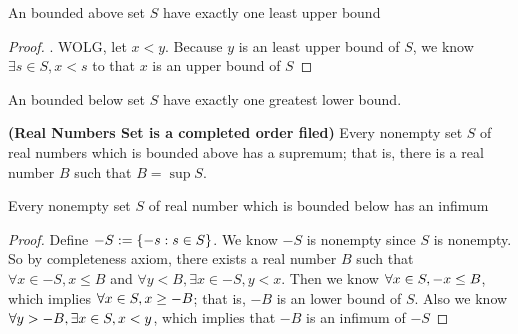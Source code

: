 \documentclass{report}
\begin{document}
\begin{theorem}
An bounded above set $S$ have exactly one least upper bound
\end{theorem}
\begin{proof}
. WOLG, let $x<y$. Because $y$ is an least upper bound of $S$, we know $\exists s\in S, x< s$ \CaC to that $x$ is an upper bound of $S$
\end{proof}
\begin{corollary}
An bounded below set $S$ have exactly one greatest lower bound.
\end{corollary}
\begin{axiom}
\textbf{(Real Numbers Set is a completed order filed)} Every nonempty set $S$ of real numbers which is bounded above has a supremum; that is, there is a real number $B$ such that $B=\sup S$.
\end{axiom}
\begin{theorem}
Every nonempty set $S$ of real number  which is bounded below has an infimum
\end{theorem}
\begin{proof}
  Define $-S:=\{ -s:s\in S \}$. We know $-S$ is nonempty since $S$ is nonempty. So by completeness axiom, there exists a real number $B$ such that $\forall x\in -S, x\leq B$ and $\forall y<B,\exists x\in -S, y<x$. Then we know $\forall x\in S,-x\leq B$, which implies $\forall x\in S, x\geq -B$; that is, $-B$ is an lower bound of $S$. Also we know  $\forall y>-B,\exists x\in S,x<y$, which implies that $-B$ is an infimum of $-S$
\end{proof}
\end{document}
